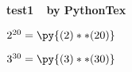 \documentclass[pdflatex]{article}
\newcommand{\power}[2]{{#1}^{#2}=\py{(#1)**(#2)}}
\begin{document}
	{\large\bf test1~~by PythonTex}\par\vspace{5mm}
	$\power{2}{20}$\par
	$\power{3}{30}$
\end{document}

